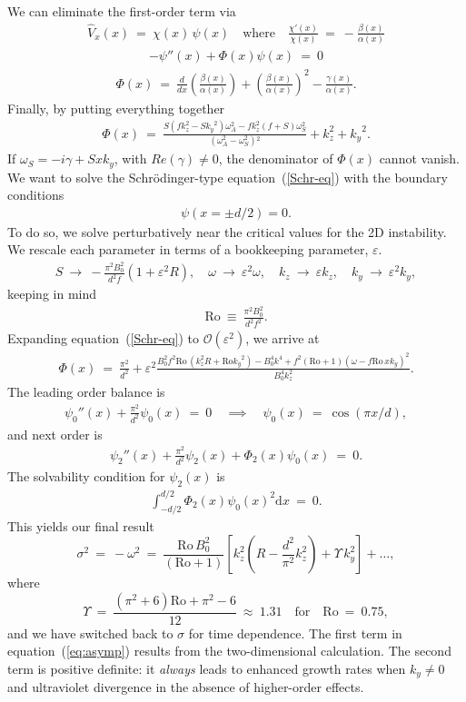 \documentclass[openacc]{rsproca_new}%
\newcommand\Beq{\begin{eqnarray}}
\newcommand\Eeq{\end{eqnarray}}
\newcommand{\Ro}{\mathrm{Ro}}
\newcommand{\eps}{\varepsilon}
\renewcommand{\ell}{\ensuremath{k_{y}}}
\begin{document}
We can eliminate the first-order term via
\Beq
\hat{V}_{x}(x) \ = \ \chi(x)\, \psi(x) \quad \text{where} \quad \frac{\chi'(x)}{\chi(x)} \  = \ -\frac{\beta (x)}{\alpha (x)}
\Eeq
\Beq
-\psi''(x) + \Phi(x) \psi(x) \ = \ 0 \label{Schr-eq}
\Eeq
\Beq
\Phi(x)  \ = \ \frac{d}{dx}\! \left( \! \frac{\beta(x)}{\alpha(x)} \! \right) + \left( \! \frac{\beta(x)}{\alpha(x)} \! \right)^{\!2} - \frac{\gamma(x)}{\alpha(x)} .
\Eeq
Finally, by putting everything together 
\Beq
\Phi(x) \ = \ \frac{S  \left(f k_{z}^2-S \ell
   ^2\right) \omega _A^2 -f k_{z}^2 (f+S) \omega
   _S^2}{\left(\omega _A^2-\omega
   _S^2\right){}^2} + k_{z}^2 + \ell^{2}.
\Eeq
If $\omega_{S}=-i \gamma+Sx\ell$, with $Re(\gamma)\neq0$, the denominator of $\Phi(x)$ cannot vanish. 
We want to solve the Schr\"{o}dinger-type equation~(\ref{Schr-eq}) with the boundary conditions 
\Beq
\psi(x=\pm d/2) = 0.
\Eeq
To do so, we solve perturbatively near the critical values for the 2D instability. We rescale each parameter in terms of a bookkeeping parameter, $\eps$.
\Beq
S  \ \to \  - \frac{\pi ^2 B_{0}^2}{d^2 f} ( 1 + \eps^{2} R), \quad \omega \ \to \ \eps^{2} \omega , \quad k_{z} \ \to \ \eps k_{z}, \quad \ell \ \to \ \eps^{2} \ell,
\Eeq 
keeping in mind
\Beq
\Ro  \ \equiv  \ \frac{\pi ^2 B_{0}^2}{d^2 f^{2}}.
\Eeq
Expanding equation~(\ref{Schr-eq}) to $\mathcal{O}(\eps^{2})$, we arrive at
\Beq
\Phi(x) \ = \ \frac{\pi^{2}}{d^{2}} + \eps^{2} \frac{B_{0}^2 f^2 \Ro\, \left(k_{z}^2 R+\Ro
   \ell ^2\right) - B_{0}^4 k^4 +f^2 (\Ro+1) (\omega -f \Ro\, x \ell
   )^2  }{B_{0}^4 k_{z}^2}.
\Eeq
The leading order balance is
\Beq
\psi_{0}''(x) + \frac{\pi^{2}}{d^{2}}  \psi_{0}(x) \ = \ 0  \quad \implies \quad \psi_{0}(x) \ = \ \cos(\pi x / d),
\Eeq
and next order is
\Beq
\psi_{2}''(x) + \frac{\pi^{2}}{d^{2}}  \psi_{2}(x) + \Phi_{2}(x)\psi_{0}(x)\ = \ 0.
\Eeq
The solvability condition for $\psi_{2}(x)$ is 
\Beq
\int_{-d/2}^{d/2} \Phi_{2}(x)\psi_{0}(x)^{2} \text{d} x \ = \ 0.
\Eeq
This yields our final result
\begin{equation}\label{eq:asymp}
\sigma^{2}\ = \ - \omega^{2} \ = \  \frac{\Ro\,B_{0}^{2}}{(\Ro+1)}\left[ k_{z}^{2}\left(R-\frac{d^2}{\pi^{2}}k_{z}^{2}\right)+\Upsilon\,k_{y}^{2}\right]+\ldots,
\end{equation}
where
\begin{equation}
\Upsilon \ = \  \frac{\left(\pi^{2}+6\right) \Ro+\pi^{2}-6}{12} \ \approx \ 1.31\quad\text{for}\quad{\Ro} \ = \ 0.75,
\end{equation}
and we have switched back to $\sigma$ for time dependence.
The first term in equation~(\ref{eq:asymp}) results from the two-dimensional calculation.
The second term is positive definite: it \emph{always} leads to enhanced growth rates when $k_{y}\neq0$ and ultraviolet divergence in the absence of higher-order effects.
\end{document}
